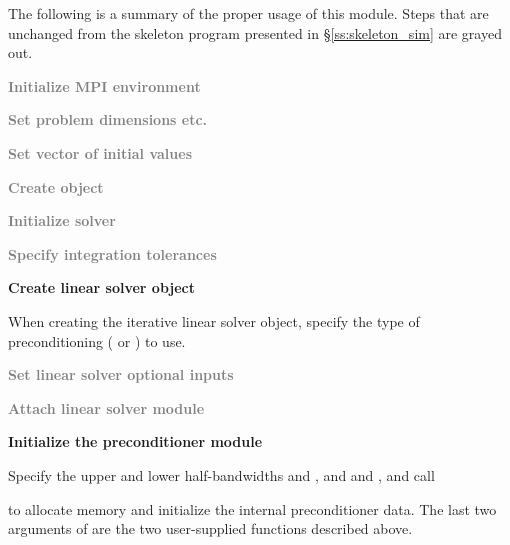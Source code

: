 The following is a summary of the proper usage of this module. Steps that are
unchanged from the skeleton program presented in \S\ref{ss:skeleton_sim} are grayed out.
\begin{Steps}
\item
  \textcolor{gray}{\bf Initialize MPI environment}

\item
  \textcolor{gray}{\bf Set problem dimensions etc.}

\item
  \textcolor{gray}{\bf Set vector of initial values}

\item
  \textcolor{gray}{\bf Create {\cvode} object}

\item
  \textcolor{gray}{\bf Initialize {\cvode} solver}

\item
  \textcolor{gray}{\bf Specify integration tolerances}

\item
  {\bf Create linear solver object}

  When creating the iterative linear solver object, specify the type
  of preconditioning ( or ) to use.

\item
  \textcolor{gray}{\bf Set linear solver optional inputs}

\item \label{i:bbdpre_attach}
  \textcolor{gray}{\bf Attach linear solver module}

\item \label{i:bbdpre_init}
  {\bf Initialize the {\cvbbdpre} preconditioner module}

  Specify the upper and lower half-bandwidths  and , and
   and , and call


   to allocate memory and initialize the internal preconditioner data.
   The last two arguments of  are the two user-supplied
   functions described above.


\end{Steps}
